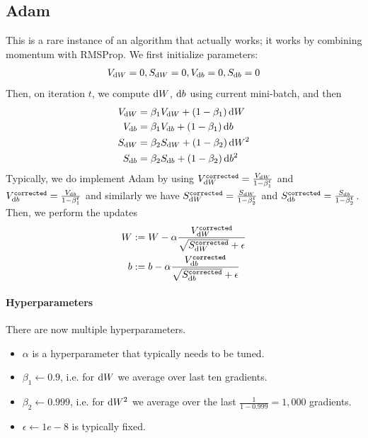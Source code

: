 \documentclass[12pt]{article}
\begin{document}
\subsection{Adam} This is a rare instance of an algorithm that actually works; it works by combining momentum with RMSProp. We first initialize parameters:
\begin{align*}   V_{\operatorname{d}\!{W}} = 0, S_{\operatorname{d}\!{W}} = 0, V_{\operatorname{d}\!{b}} = 0, S_{\operatorname{d}\!{b}} = 0 \end{align*}
Then, on iteration $t$, we compute 
$\operatorname{d}\!{W}$, $\operatorname{d}\!{b}$ using current mini-batch, and then
\begin{align*}   V_{\d W} &= \beta_1 V_{\d W} + (1-\beta_1) \d W \\ 
  V_{\d b} &= \beta_1 V_{\d b} + (1-\beta_1) \d b \\ 
  S_{\d W} &= \beta_2 S_{\d W} + (1-\beta_2) \d W^2 \\
  S_{\d b} &= \beta_2 S_{\d b} + (1-\beta_2) \d b^2 \end{align*}
Typically, we do implement Adam by using $V^{\texttt{corrected}}_{\operatorname{d}\!{W}} = \frac{V_{\operatorname{d}\!{W}}}{1-\beta_1^t}$ and $V^{\texttt{corrected}}_{\operatorname{d}\!{b}} = \frac{V_{\operatorname{d}\!{b}}}{1 - \beta_1^t}$ and similarly we have
$S^{\texttt{corrected}}_{\operatorname{d}\!{W}} = \frac{S_{\operatorname{d}\!{W}}}{1-\beta_2^t}$ and $S^{\texttt{corrected}}_{\operatorname{d}\!{b}} = \frac{S_{\operatorname{d}\!{b}}}{1-\beta_2^t}$. Then, we perform the updates
\begin{align*}   W &:= W - \alpha \frac{V^{\texttt{corrected}}_{\operatorname{d}\!{W}}}{\sqrt{S^{\texttt{corrected}}_{\operatorname{d}\!{W}}} + \epsilon} \\
  b &:= b - \alpha \frac{V^{\texttt{corrected}}_{\operatorname{d}\!{b}}}{\sqrt{S^{\texttt{corrected}}_{\operatorname{d}\!{b}}} + \epsilon} \end{align*}
\paragraph{Hyperparameters}
There are now multiple hyperparameters.
\begin{itemize}   \item $\alpha$ is a hyperparameter that typically needs to be tuned.
\item $\beta_1 \gets 0.9$, i.e. for $\operatorname{d}\!{W}$ we average over last ten gradients.
\item $\beta_2 \gets 0.999$, i.e. for $\operatorname{d}\!{W}^2$ we average over the last $\frac{1}{1 - 0.999} = 1,000$ gradients.
\item $\epsilon \gets 1e-8$ is typically fixed. \end{itemize}
\end{document}
